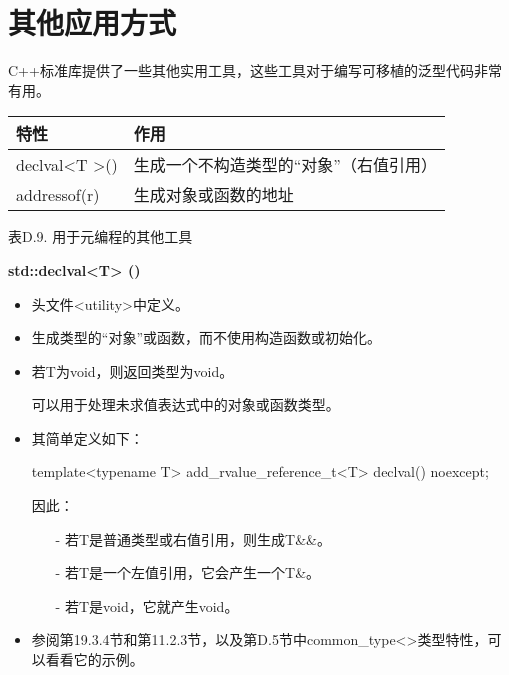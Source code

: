 \section{其他应用方式}


C++标准库提供了一些其他实用工具，这些工具对于编写可移植的泛型代码非常有用。

\begin{table}[H]
	\begin{center}
	\begin{tabular}{l|l}
		\hline
		\textbf{特性}                       & \textbf{作用}                                                         \\ \hline
		declval\textless{}T \textgreater{}() & 生成一个不构造类型的“对象”（右值引用） \\ \hline
		addressof(r)                         & 生成对象或函数的地址                             \\ \hline
	\end{tabular}
	\end{center}
\end{table}

\begin{center}
表D.9. 用于元编程的其他工具
\end{center}

\textbf{std::declval<T> ()}

\begin{itemize}
\item 
头文件<utility>中定义。

\item 
生成类型的“对象”或函数，而不使用构造函数或初始化。

\item 
若T为void，则返回类型为void。

可以用于处理未求值表达式中的对象或函数类型。

\item 
其简单定义如下：
\begin{cpp}
template<typename T>
add_rvalue_reference_t<T> declval() noexcept;
\end{cpp}

因此：

\begin{itemize}
\item[-]
若T是普通类型或右值引用，则生成T\&\&。

\item[-]
若T是一个左值引用，它会产生一个T\&。

\item[-]
若T是void，它就产生void。
\end{itemize}

\item 
参阅第19.3.4节和第11.2.3节，以及第D.5节中common\_type<>类型特性，可以看看它的示例。
\end{itemize}

